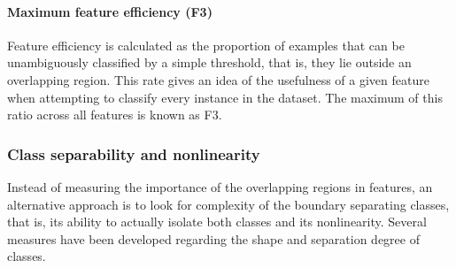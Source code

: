 \documentclass[
	fontsize=11pt, %
	twoside=false, %
	open=any, %
	secnumdepth=1, %
]{kaobook}
\begin{document}
\paragraph*{Maximum feature efficiency (F3)} Feature efficiency is calculated as the proportion of examples that can be unambiguously classified by a simple threshold, that is, they lie outside an overlapping region. This rate gives an idea of the usefulness of a given feature when attempting to classify every instance in the dataset. The maximum of this ratio across all features is known as F3.

\subsubsection{Class separability and nonlinearity}

Instead of measuring the importance of the overlapping regions in features, an alternative approach is to look for complexity of the boundary separating classes, that is, its ability to actually isolate both classes and its nonlinearity. Several measures have been developed regarding the shape and separation degree of classes.
\end{document}
